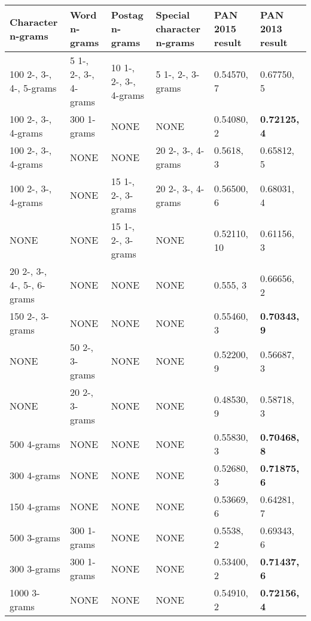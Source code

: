 \begin{landscape}
\begin{table}
    \small
    \centering
    \begin{tabular}{llll|ll}
        \textbf{Character n-grams} & \textbf{Word n-grams} &
        \textbf{Postag n-grams} & \textbf{Special character n-grams} &
        \textbf{PAN 2015 result} & \textbf{PAN 2013 result} \\
        \hline
        100 2-, 3-, 4-, 5-grams & 5 1-, 2-, 3-, 4-grams &
        10 1-, 2-, 3-, 4-grams & 5 1-, 2-, 3-grams & 0.54570, 7 & 0.67750, 5 \\
        100 2-, 3-, 4-grams & 300 1-grams & NONE & NONE & 0.54080, 2 &
        \textbf{0.72125, 4} \\
        100 2-, 3-, 4-grams & NONE & NONE & 20 2-, 3-, 4-grams &
        0.5618, 3 & 0.65812, 5 \\
        100 2-, 3-, 4-grams & NONE & 15 1-, 2-, 3-grams & 20 2-, 3-, 4-grams &
        0.56500, 6 & 0.68031, 4 \\
        NONE & NONE & 15 1-, 2-, 3-grams & NONE & 0.52110, 10 & 0.61156, 3 \\
        20 2-, 3-, 4-, 5-, 6-grams & NONE & NONE & NONE & 0.555, 3 &
        0.66656, 2 \\
        150 2-, 3-grams & NONE & NONE & NONE & 0.55460, 3 &
        \textbf{0.70343, 9} \\
        NONE & 50 2-, 3-grams & NONE & NONE & 0.52200, 9 & 0.56687, 3 \\
        NONE & 20 2-, 3-grams & NONE & NONE & 0.48530, 9 & 0.58718, 3 \\
        500 4-grams & NONE & NONE & NONE & 0.55830, 3 & \textbf{0.70468, 8} \\
        300 4-grams & NONE & NONE & NONE & 0.52680, 3 & \textbf{0.71875, 6} \\
        150 4-grams & NONE & NONE & NONE & 0.53669, 6 & 0.64281, 7 \\
        500 3-grams & 300 1-grams & NONE & NONE & 0.5538, 2 & 0.69343, 6 \\
        300 3-grams & 300 1-grams & NONE & NONE & 0.53400, 2 &
        \textbf{0.71437, 6} \\
        1000 3-grams & NONE & NONE & NONE & 0.54910, 2 & \textbf{0.72156, 4} \\

\end{tabular}
\end{table}
\end{landscape}
